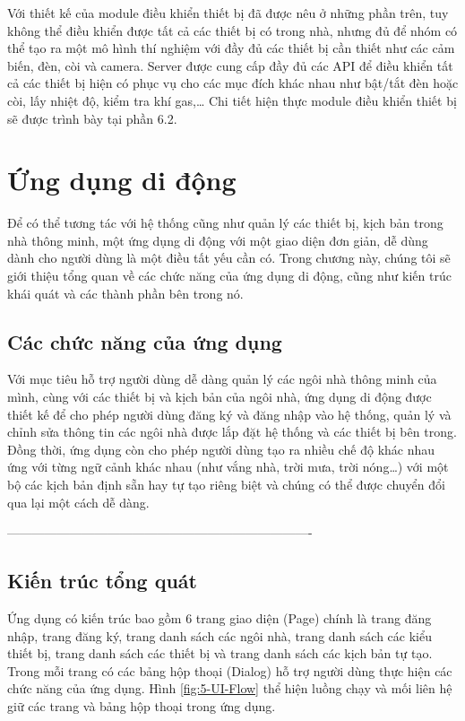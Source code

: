 \documentclass[12pt,a4paper,oneside]{extbook}
\begin{document}
Với thiết kế của module điều khiển thiết bị đã được nêu ở những phần trên, tuy không thể điều khiển được tất cả các thiết bị có trong nhà, nhưng đủ để nhóm có thể tạo ra một mô hình thí nghiệm với đầy đủ các thiết bị cần thiết như các cảm biến, đèn, còi và camera. Server được cung cấp đầy đủ các API để điều khiển tất cả các thiết bị hiện có phục vụ cho các mục đích khác nhau như bật/tắt đèn hoặc còi, lấy nhiệt độ, kiểm tra khí gas,\dots\hspace{0mm} Chi tiết hiện thực module điều khiển thiết bị sẽ được trình bày tại phần 6.2.


\chapter{Ứng dụng di động}

Để có thể tương tác với hệ thống cũng như quản lý các thiết bị, kịch bản trong nhà thông minh, một ứng dụng di động với một giao diện đơn giản, dễ dùng dành cho người dùng là một điều tất yếu cần có. Trong chương này, chúng tôi sẽ giới thiệu tổng quan về các chức năng của ứng dụng di động, cũng như kiến trúc khái quát và các thành phần bên trong nó.


\section{Các chức năng của ứng dụng}

Với mục tiêu hỗ trợ người dùng dễ dàng quản lý các ngôi nhà thông minh của mình, cùng với các thiết bị và kịch bản của ngôi nhà, ứng dụng di động được thiết kế để cho phép người dùng đăng ký và đăng nhập vào hệ thống, quản lý và chỉnh sửa thông tin các ngôi nhà được lắp đặt hệ thống và các thiết bị bên trong. Đồng thời, ứng dụng còn cho phép người dùng tạo ra nhiều chế độ khác nhau ứng với từng ngữ cảnh khác nhau (như vắng nhà, trời mưa, trời nóng…) với một bộ các kịch bản định sẵn hay tự tạo riêng biệt và chúng có thể được chuyển đổi qua lại một cách dễ dàng.

-------------------------------------------------------------------------%
\section{Kiến trúc tổng quát}
Ứng dụng có kiến trúc bao gồm 6 trang giao diện (Page) chính là trang đăng nhập, trang đăng ký, trang danh sách các ngôi nhà, trang danh sách các kiểu thiết bị, trang danh sách các thiết bị và trang danh sách các kịch bản tự tạo. Trong mỗi trang có các bảng hộp thoại (Dialog) hỗ trợ người dùng thực hiện các chức năng của ứng dụng. Hình \ref{fig:5-UI-Flow} thể hiện luồng chạy và mối liên hệ giữ các trang và bảng hộp thoại trong ứng dụng.
\end{document}
